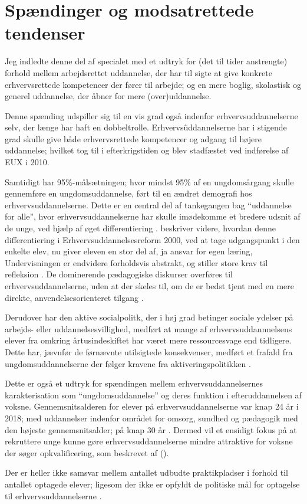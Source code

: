\section{Spændinger og modsatrettede tendenser}

Jeg indledte denne del af specialet med et udtryk for (det til tider anstrengte) forhold mellem arbejdsrettet uddannelse, der har til sigte at give konkrete erhvervsrettede kompetencer der fører til arbejde; og en mere boglig, skolastisk og generel uddannelse, der åbner for mere (over)uddannelse.

Denne spænding udspiller sig til en vis grad også indenfor erhvervsuddannelserne selv, der længe har haft en dobbeltrolle.
Erhvervs\~uddannelserne har i stigende grad skulle give både erhvervsrettede kompetencer og adgang til højere uddannelse; hvilket tog til i efterkrigstiden \autocite[s. 47ff]{bondergaardHistoricalEmergenceKey2014} og blev stadfæstet ved indførelse af EUX i 2010.


Samtidigt har 95\%-målsætningen; hvor mindst 95\% af en ungdomsårgang skulle gennemføre en ungdomsuddannelse, ført til en ændret demografi hos erhvervsuddannelserne.
Dette er en central del af tankegangen bag “uddannelse for alle”, hvor erhvervsuddannelserne har skulle imødekomme et bredere udsnit af de unge, ved hjælp af øget differentiering \autocite[s. 365f]{aarkrogRummelighedOgSammenhaeng2003}.
\citeauthor{aarkrogRummelighedOgSammenhaeng2003} beskriver videre, hvordan denne differentiering i Erhvervsuddannelsesreform 2000, ved at tage udgangspunkt i den enkelte elev, nu giver eleven en  stor del af, ja ansvar for egen læring, Undervisningen er endvidere forholdsvis abstrakt, og stiller store krav til refleksion \citeyear[s. 367f]{aarkrogRummelighedOgSammenhaeng2003}.
De dominerende pædagogiske diskurser overføres til erhvervsuddannelserne, uden at der skeles til, om de er bedst tjent med en mere direkte, anvendelsesorienteret tilgang \autocite[s. ]{aarkrogRummelighedOgSammenhaeng2003}.

Derudover har den aktive socialpolitk, der i høj grad betinger sociale ydelser på arbejds- eller uddannelsesvillighed, medført at mange af erhvervsuddannnelsens elever fra omkring årtusindeskiftet har været mere ressourcesvage end tidligere.
Dette har, jævnfør de førnævnte utilsigtede konsekvenser, medført et frafald fra ungdomsuddannelserne der følger kravene fra aktiveringspolitikken \autocite[s.13]{jorgensenReformenAfErhvervsuddannelserne2016}.

Dette er også et udtryk for spændingen mellem erhvervsuddannelsernes karakterisation som “ungdomsuddannelse” og deres funktion i efteruddannelsen af voksne.
Gennemsnitsalderen for elever på erhvervsuddannelserne var knap 24 år i 2018; med uddannelser indenfor området for omsorg, sundhed og pædagogik med den højeste gennemsnitsalder; på knap 30 år \autocite[s. 14]{danmarksstatistikErhvervsuddannelserDanmark20192019}.
Dermed vil et ensidigt fokus på at rekruttere unge kunne gøre erhvervsuddannelserne mindre attraktive for voksne der søger opkvalificering, som beskrevet af \citeauthor{jorgensenReformenAfErhvervsuddannelserne2016} (\citeyear[s. 13]{jorgensenReformenAfErhvervsuddannelserne2016}).

Der er heller ikke samsvar mellem antallet udbudte praktikpladser i forhold til antallet optagede elever; ligesom der ikke er opfyldt de politiske mål for optagelse til erhvervsuddannelserne \autocite[s. 10]{danmarksstatistikErhvervsuddannelserDanmark20192019}.


